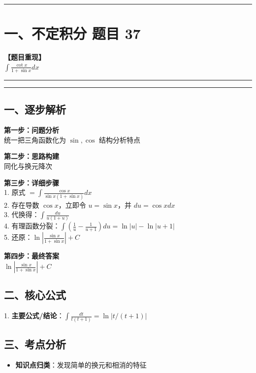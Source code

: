 ﻿\documentclass[12pt, a4paper]{ctexart}
\newcommand{\TopSeparator}{
    \par\noindent\rule{\textwidth}{1.5pt}\vspace{0.5em}
}
\newcommand{\AnalysisSeparator}{
    \par\noindent\rule{\textwidth}{0.5pt}\vspace{0.2em}\hrule\vspace{0.5em}
}
\newenvironment{RedAnalysis}{
    \par
    \color{red} 
}{
    \par
    \color{black} 
}
\begin{document}
\vspace{2em}

\TopSeparator
\section*{一、不定积分 题目 37}

\textbf{【题目重现】} \\
$\int \frac{\cot x}{1+\sin x} dx$

\AnalysisSeparator

\begin{RedAnalysis}

	\subsection*{一、逐步解析}

	\textbf{第一步：问题分析} \\
	统一把三角函数化为 $\sin, \cos$ 结构分析特点

	\textbf{第二步：思路构建} \\
	同化与换元降次

	\textbf{第三步：详细步骤} \\
	1. 原式 $= \int \frac{\cos x}{\sin x(1+\sin x)} dx$ \\ 
	2. 存在导数 $\cos x$，立即令 $u = \sin x$，并 $du = \cos x dx$ \\ 
	3. 代换得：$\int \frac{du}{u(1+u)}$ \\ 
	4. 有理函数分裂：$\int (\frac{1}{u} - \frac{1}{u+1}) du = \ln|u| - \ln|u+1|$ \\ 
	5. 还原：$ \ln\left|\frac{\sin x}{1+\sin x}\right| + C$

	\textbf{第四步：最终答案} \\
	$\ln\left|\frac{\sin x}{1+\sin x}\right| + C$

	\subsection*{二、核心公式}
	1. \textbf{主要公式/结论}：$\int \frac{dt}{t(t+1)} = \ln|t/(t+1)|$

	\subsection*{三、考点分析}
	\begin{itemize}
		\item \textbf{知识点归类}：发现简单的换元和相消的特征
	\end{itemize}

\end{RedAnalysis}
\end{document}
